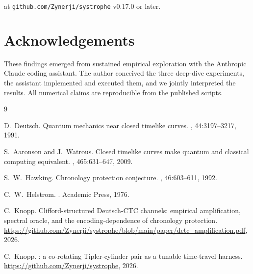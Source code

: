\documentclass[11pt,a4paper]{article}
\begin{document}
at \texttt{github.com/Zynerji/systrophe} v0.17.0 or later.

\section*{Acknowledgements}

These findings emerged from sustained empirical exploration with
the Anthropic Claude coding assistant. The author conceived the
three deep-dive experiments, the assistant implemented and executed
them, and we jointly interpreted the results. All numerical claims
are reproducible from the published scripts.


\begin{thebibliography}{9}

D.~Deutsch.
\newblock Quantum mechanics near closed timelike curves.
, 44:3197--3217, 1991.

S.~Aaronson and J.~Watrous.
\newblock Closed timelike curves make quantum and classical computing
equivalent.
, 465:631--647, 2009.

S.~W.~Hawking.
\newblock Chronology protection conjecture.
, 46:603--611, 1992.

C.~W.~Helstrom.
.
\newblock Academic Press, 1976.

C.~Knopp.
\newblock Clifford-structured Deutsch-CTC channels: empirical
amplification, spectral oracle, and the encoding-dependence of
chronology protection.
\newblock \url{https://github.com/Zynerji/systrophe/blob/main/paper/dctc_amplification.pdf}, 2026.

C.~Knopp.
: a co-rotating Tipler-cylinder pair as a tunable
time-travel harness.
\newblock \url{https://github.com/Zynerji/systrophe}, 2026.

\end{thebibliography}
\end{document}
